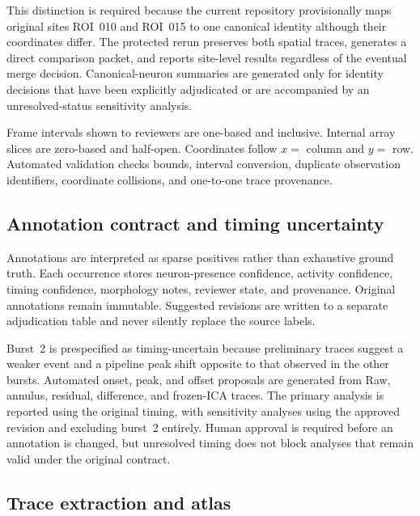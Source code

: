 This distinction is required because the current repository provisionally maps original sites ROI~010 and ROI~015 to one canonical identity although their coordinates differ. The protected rerun preserves both spatial traces, generates a direct comparison packet, and reports site-level results regardless of the eventual merge decision. Canonical-neuron summaries are generated only for identity decisions that have been explicitly adjudicated or are accompanied by an unresolved-status sensitivity analysis.

Frame intervals shown to reviewers are one-based and inclusive. Internal array slices are zero-based and half-open. Coordinates follow $x=$ column and $y=$ row. Automated validation checks bounds, interval conversion, duplicate observation identifiers, coordinate collisions, and one-to-one trace provenance.

\subsection{Annotation contract and timing uncertainty}

Annotations are interpreted as sparse positives rather than exhaustive ground truth. Each occurrence stores neuron-presence confidence, activity confidence, timing confidence, morphology notes, reviewer state, and provenance. Original annotations remain immutable. Suggested revisions are written to a separate adjudication table and never silently replace the source labels.

Burst~2 is prespecified as timing-uncertain because preliminary traces suggest a weaker event and a pipeline peak shift opposite to that observed in the other bursts. Automated onset, peak, and offset proposals are generated from Raw, annulus, residual, difference, and frozen-ICA traces. The primary analysis is reported using the original timing, with sensitivity analyses using the approved revision and excluding burst~2 entirely. Human approval is required before an annotation is changed, but unresolved timing does not block analyses that remain valid under the original contract.

\subsection{Trace extraction and atlas}
\label{sec:trace-atlas-methods}

